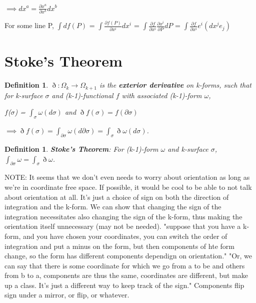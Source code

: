 \documentclass{book}
\newtheorem{defn}[equation]{Definition}
\begin{document}
$\implies dx^a = \frac{\partial x^a}{\partial x^b}dx^b $

For some line P, $\int df(P)$ = $\int \frac{\partial f(P)}{{\partial x^i}} dx^i$ = $\int \frac{\partial f}{\partial x^i}\frac{\partial x^i}{\partial P}dP$ = $\int \frac{{\partial f}}{{\partial x^i}} e^i (dx^j e_j)$
\section{Stoke's Theorem}



\begin{defn}
	$\eth : \Omega_k \to \Omega_{k+1}$ is the \textbf{exterior derivative} on k-forms, such that for k-surface $\sigma$ and (k-1)-functional $f$ with associated (k-1)-form $\omega$, 
	
	$f$($\sigma$) = $\int_{\sigma}\omega(d\sigma)$ and $\eth f(\sigma) = f(\partial\sigma)$
	
	$\implies \eth f(\sigma) = \int_{\partial\sigma} \omega(d\partial\sigma) = \int_{\sigma} \eth\omega(d\sigma)$. 
\end{defn}




 



\begin{defn}
	\textbf{Stoke's Theorem}: For (k-1)-form $\omega$ and k-surface $\sigma$, $\int_{\partial \sigma}\omega = \int_{\sigma}\eth\omega$. 
\end{defn}

NOTE: It seems that we don't even needs to worry about orientation as long as we're in coordinate free space. If possible, it would be cool to be able to not talk about orientation at all. It's just a choice of sign on both the direction of integration and the k-form. We can show that changing the sign of the integration necessitates also changing the sign of the k-form, thus making the orientation itself unnecessary (may not be needed). "suppose that you have a k-form, and you have chosen your coordinates, you can switch the order of integration and put a minus on the form, but then components of hte form change, so the form has different components dependign on orientation." "Or, we can say that there is some coordinate for which we go from a to be and others from b to a, components are thus the same, coordinates are different, but make up a class. It's just a different way to keep track of the sign." Components flip sign under a mirror, or flip, or whatever. 
\end{document}
